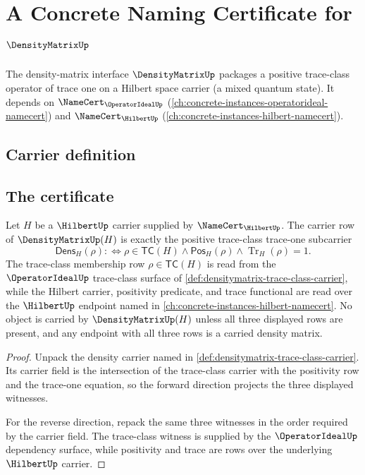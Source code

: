 \chapter{A Concrete Naming Certificate for $\DensityMatrixUp$}
\label{ch:concrete-instances-densitymatrix-namecert}

The density-matrix interface $\DensityMatrixUp$ packages a positive trace-class operator of trace one on a Hilbert space carrier (a mixed quantum state). It depends on $\NameCert_{\OperatorIdealUp}$ (\autoref{ch:concrete-instances-operatorideal-namecert}) and $\NameCert_{\HilbertUp}$ (\autoref{ch:concrete-instances-hilbert-namecert}).

\section{Carrier definition}
\label{sec:densitymatrix-carrier}

\section{The certificate}
\label{sec:densitymatrix-certificate}

\begin{theorem}
\label{thm:densitymatrix-carrier-obligation}
Let $H$ be a $\HilbertUp$ carrier supplied by $\NameCert_{\HilbertUp}$. The carrier row of $\DensityMatrixUp(H)$ is exactly the positive trace-class trace-one subcarrier
$$
\mathsf{Dens}_H(\rho)
:\Longleftrightarrow
\rho\in\mathsf{TC}(H)\land \mathsf{Pos}_H(\rho)\land \operatorname{Tr}_H(\rho)=1.
$$
The trace-class membership row $\rho\in\mathsf{TC}(H)$ is read from the $\OperatorIdealUp$ trace-class surface of \autoref{def:densitymatrix-trace-class-carrier}, while the Hilbert carrier, positivity predicate, and trace functional are read over the $\HilbertUp$ endpoint named in \autoref{ch:concrete-instances-hilbert-namecert}. No object is carried by $\DensityMatrixUp(H)$ unless all three displayed rows are present, and any endpoint with all three rows is a carried density matrix.
\end{theorem}
\begin{proof}
Unpack the density carrier named in \autoref{def:densitymatrix-trace-class-carrier}. Its carrier field is the intersection of the trace-class carrier with the positivity row and the trace-one equation, so the forward direction projects the three displayed witnesses.

For the reverse direction, repack the same three witnesses in the order required by the carrier field. The trace-class witness is supplied by the $\OperatorIdealUp$ dependency surface, while positivity and trace are rows over the underlying $\HilbertUp$ carrier.
\end{proof}

